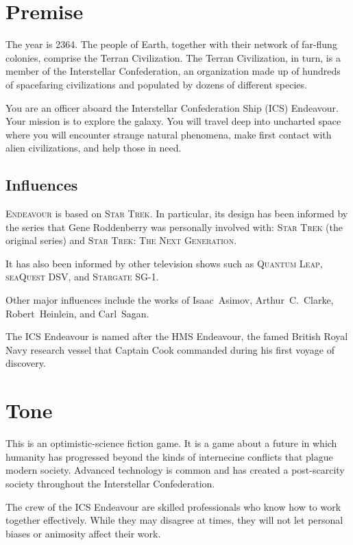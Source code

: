 \documentclass[11pt, a5paper, parskip=half-, DIV=12]{scrartcl}
\newcommand{\ENDEAVOUR}{\textsc{Endeavour}}%
\begin{document}
\section*{Premise}
The year is 2364.
The people of Earth, together with their network of far-flung colonies, comprise the Terran Civilization. The Terran Civilization, in turn, is a member of the Interstellar Confederation, an organization made up of hundreds of spacefaring civilizations and populated by dozens of different species.

You are an officer aboard the Interstellar Confederation Ship (ICS) Endeavour. Your mission is to explore the galaxy. You will travel deep into uncharted space where you will encounter strange natural phenomena, make first contact with alien civilizations, and help those in need.

\subsection*{Influences}
\ENDEAVOUR{} is based on \textsc{Star Trek}. In particular, its design has been informed by the series that Gene Roddenberry was personally involved with: \textsc{Star Trek} (the original series) and \textsc{Star Trek: The Next Generation}.

It has also been informed by other television shows such as \textsc{Quantum Leap}, \textsc{seaQuest DSV}, and \textsc{Stargate SG-1}.%

Other major influences include the works of Isaac~Asimov, Arthur~C.~Clarke, Robert~Heinlein, and Carl~Sagan.
 
The ICS Endeavour is named after the HMS Endeavour, the famed British Royal Navy research vessel that Captain Cook commanded during his first voyage of discovery.
\newpage

\section*{Tone}
This is an optimistic-science fiction game. It is a game about a future in which humanity has progressed beyond the kinds of internecine conflicts that plague modern society. Advanced technology is common and has created a post-scarcity society throughout the Interstellar Confederation.

The crew of the ICS Endeavour are skilled professionals who know how to work together effectively. While they may disagree at times, they will not let personal biases or animosity affect their work.
\end{document}
